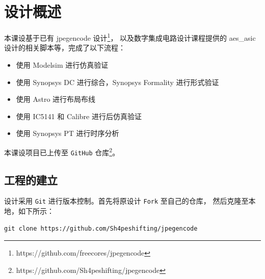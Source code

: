 \documentclass[12pt,hyperref,a4paper,UTF8]{ctexart}
\begin{document}
\cover

%
%

\thispagestyle{empty} %

\newpage
\tableofcontents

\newpage


\section{设计概述}
本课设基于已有 jpegencode 设计\footnote{https://github.com/freecores/jpegencode}，
以及数字集成电路设计课程提供的 aes\_asic 设计的相关脚本等，完成了以下流程：
\begin{itemize}
    \item 使用 Modelsim 进行仿真验证
    \item 使用 Synopsys DC 进行综合，Synopsys Formality 进行形式验证
    \item 使用 Astro 进行布局布线
    \item 使用 IC5141 和 Calibre 进行后仿真验证
    \item 使用 Synopsys PT 进行时序分析
\end{itemize}
本课设项目已上传至 \texttt{GitHub} 仓库\footnote{https://github.com/Sh4peshifting/jpegencode}。

\subsection{工程的建立}
设计采用 \texttt{Git} 进行版本控制。首先将原设计 \texttt{Fork} 至自己的仓库，
然后克隆至本地，如下所示：
\begin{lstlisting}[style=bashstyle]
    git clone https://github.com/Sh4peshifting/jpegencode
\end{lstlisting}
\end{document}
